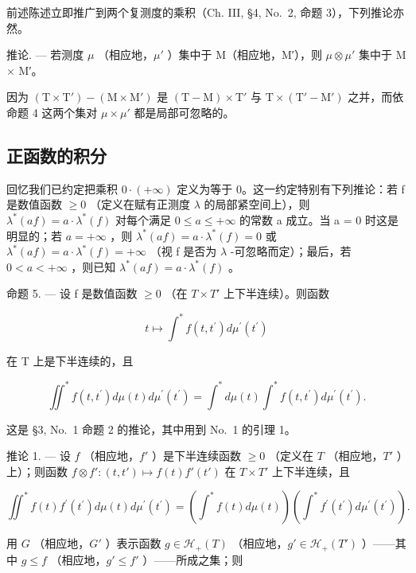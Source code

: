前述陈述立即推广到两个复测度的乘积（Ch. III, §4, No.~2, 命题 3），下列推论亦然。

推论. --- 若测度 \(\mu\) （相应地，\(\mu'\) ）集中于 M（相应地，M′），则 \(\mu \otimes \mu'\) 集中于 M × M′。

因为 \((\mathrm{T} \times \mathrm{T}') - (\mathrm{M} \times \mathrm{M}')\) 是 \((\mathrm{T} - \mathrm{M}) \times \mathrm{T}'\) 与 \(\mathrm{T} \times (\mathrm{T}' - \mathrm{M}')\) 之并，而依命题 4 这两个集对 \(\mu \times \mu'\) 都是局部可忽略的。

\subsection{正函数的积分}

回忆我们已约定把乘积 \(0 \cdot (+\infty)\) 定义为等于 0。这一约定特别有下列推论：若 f 是数值函数 \(\geqslant 0\) （定义在赋有正测度 \(\lambda\) 的局部紧空间上），则 \(\lambda^{*}(af) = a \cdot \lambda^{*}(f)\) 对每个满足 \(0 \leqslant a \leqslant +\infty\) 的常数 a 成立。当 a = 0 时这是明显的；若 \(a = +\infty\) ，则 \(\lambda^{*}(af) = a \cdot \lambda^{*}(f) = 0\) 或 \(\lambda^{*}(af) = a \cdot \lambda^{*}(f) = +\infty\) （视 f 是否为 \(\lambda\) -可忽略而定）；最后，若 \(0 < a < +\infty\) ，则已知 \(\lambda^{*}(af) = a \cdot \lambda^{*}(f)\) 。

命题 5. --- 设 f 是数值函数 \(\geqslant 0\) （在 \(T \times T'\) 上下半连续）。则函数

\[
t \mapsto \int^ {*} f (t, t ^ {\prime}) d \mu^ {\prime} (t ^ {\prime})
\]

在 T 上是下半连续的，且

\[
\iint^ {*} f (t, t ^ {\prime}) d \mu (t) d \mu^ {\prime} (t ^ {\prime}) = \int^ {*} d \mu (t) \int^ {*} f (t, t ^ {\prime}) d \mu^ {\prime} (t ^ {\prime}).\tag{3}
\]

这是 §3, No.~1 命题 2 的推论，其中用到 No.~1 的引理 1。

推论 1. --- 设 \(f\) （相应地，\(f'\) ）是下半连续函数 \(\geqslant 0\) （定义在 \(T\) （相应地，\(T'\) ）上）；则函数 \(f \otimes f': (t, t') \mapsto f(t)f'(t')\) 在 \(T \times T'\) 上下半连续，且

\[
\iint^ {*} f (t) f ^ {\prime} \left(t ^ {\prime}\right) d \mu (t) d \mu^ {\prime} \left(t ^ {\prime}\right) = \left(\int^ {*} f (t) d \mu (t)\right) \left(\int^ {*} f ^ {\prime} \left(t ^ {\prime}\right) d \mu^ {\prime} \left(t ^ {\prime}\right)\right).\tag{6}
\]

用 \(G\) （相应地，\(G'\) ）表示函数 \(g \in \mathcal{H}_{+}(T)\) （相应地，\(g' \in \mathcal{H}_{+}(T')\) ）——其中 \(g \leqslant f\) （相应地，\(g' \leqslant f'\) ）——所成之集；则


